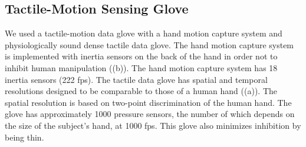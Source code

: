 \documentclass[letterpaper, 10 pt, conference]{IEEEtran}  %
\begin{document}




\subsection{Tactile-Motion Sensing Glove}
We used a tactile-motion data glove with a hand motion capture system and physiologically sound dense tactile data glove\cite{SagisakaONOK12}. The hand motion capture system is implemented with inertia sensors on the back of the hand in order not to inhibit human manipulation ((b)). The hand motion capture system has 18 inertia sensors (222 fps). The tactile data glove has spatial and temporal resolutions designed to be comparable to those of a human hand ((a)). The spatial resolution is based on two-point discrimination of the human hand\cite{weinstein1968intensive}. The glove has approximately 1000 pressure sensors, the number of which depends on the size of the subject's hand, at 1000 fps. This glove also minimizes inhibition by being thin.
\end{document}
